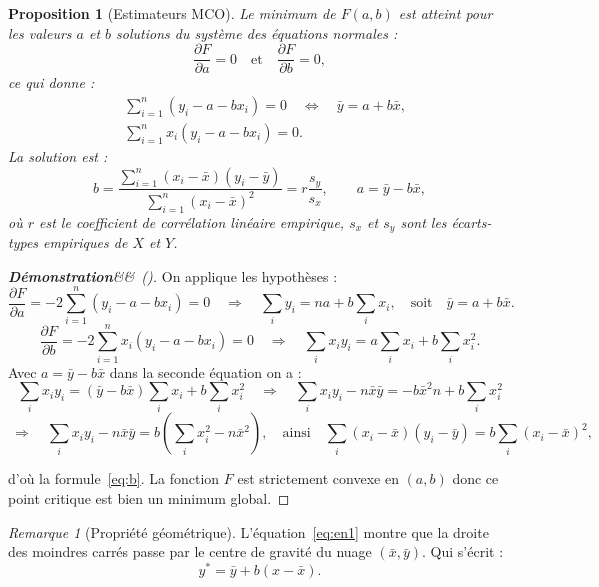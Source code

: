 \documentclass[12pt,a4paper]{article}
\newtheorem{proposition}[theoreme]{Proposition}
\theoremstyle{definition}
\theoremstyle{remark}
\newtheorem{remarque}[theoreme]{Remarque}
\newenvironment{demonstration}[1][]
  {\begin{proof}[\textbf{Démonstration}\ifx&#1&\else\ (#1)\fi]}
  {\end{proof}}
\newcommand{\xbar}{\bar{x}}
\newcommand{\ybar}{\bar{y}}
\begin{document}
\begin{proposition}[Estimateurs MCO]
\label{prop:mco}
Le minimum de $F(a,b)$ est atteint pour les valeurs $a$ et $b$ solutions du
système des équations normales :
\[
  \frac{\partial F}{\partial a} = 0 \quad \text{et} \quad \frac{\partial F}{\partial b} = 0,
\]
ce qui donne :
\begin{align}
  \label{eq:en1}
  &\sum_{i=1}^n (y_i - a - bx_i) = 0 \quad \Longleftrightarrow \quad \ybar = a + b\xbar, \\
  \label{eq:en2}
  &\sum_{i=1}^n x_i(y_i - a - bx_i) = 0.
\end{align}
La solution est :
\begin{equation}
  \label{eq:b}
  {b = \frac{\displaystyle\sum_{i=1}^n (x_i - \xbar)(y_i - \ybar)}
               {\displaystyle\sum_{i=1}^n (x_i - \xbar)^2}
            = r \frac{s_y}{s_x}},
  \qquad
  {a = \ybar - b\xbar},
\end{equation}
où $r$ est le coefficient de corrélation linéaire empirique, $s_x$ et $s_y$ sont
les écarts-types empiriques de $X$ et $Y$.
\end{proposition}
\smallskip
\begin{demonstration} 
On applique les hypothèses :
\[
  \frac{\partial F}{\partial a} = -2\sum_{i=1}^n(y_i - a - bx_i) = 0
  \quad \Rightarrow \quad \sum_i y_i = na + b\sum_i x_i,
  \quad \text{soit} \quad \ybar = a + b\xbar.
\]
\[
  \frac{\partial F}{\partial b} = -2\sum_{i=1}^n x_i(y_i - a - bx_i) = 0
  \quad \Rightarrow \quad \sum_i x_i y_i = a\sum_i x_i + b\sum_i x_i^2.
\]
Avec $a = \ybar - b\xbar$ dans la seconde équation on a :
\[
\sum_i x_i y_i = (\ybar - b\xbar) \sum_i x_i + b\sum_i x_i^2 \quad \Rightarrow \quad \sum_i x_i y_i -n\xbar\ybar = -b\xbar^2n + b \sum_i x_i^2
\]
\[
\ \Rightarrow \quad
  \sum_i x_i y_i - n\xbar\ybar = b\!\left(\sum_i x_i^2 - n\xbar^2\right),
  \quad \text{ainsi} \quad
  \sum_i (x_i - \xbar)(y_i - \ybar) = b\sum_i(x_i-\xbar)^2,
\]

d'où la formule~\eqref{eq:b}. 
La fonction $F$ est strictement convexe en $(a,b)$
donc ce point critique est bien un minimum global.
\end{demonstration}

\begin{remarque}[Propriété géométrique]
L'équation~\eqref{eq:en1} montre que la droite des moindres carrés passe par le
centre de gravité du nuage $(\xbar, \ybar)$. Qui s'écrit :
\[
  y^* = \ybar + b(x - \xbar).
\]
\end{remarque}
\end{document}
